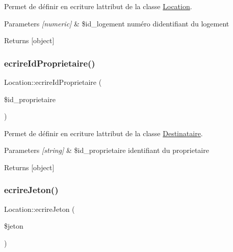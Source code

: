 Permet de définir en ecriture l\textquotesingle{}attribut de la classe \hyperlink{class_location}{Location}. 


\begin{DoxyParams}{Parameters}
{\em \mbox{[}numeric\mbox{]}} & \$id\+\_\+logement numéro d\textquotesingle{}identifiant du logement \\
\hline
\end{DoxyParams}
\begin{DoxyReturn}{Returns}
\mbox{[}object\mbox{]} 
\end{DoxyReturn}
\mbox{\label{class_location_a7d047747d2fe3745641adee427b1b6e0}} 
\subsubsection{\texorpdfstring{ecrire\+Id\+Proprietaire()}{ecrireIdProprietaire()}}
{\footnotesize\ttfamily Location\+::ecrire\+Id\+Proprietaire (\begin{DoxyParamCaption}\item[{}]{\$id\+\_\+proprietaire }\end{DoxyParamCaption})}



Permet de définir en ecriture l\textquotesingle{}attribut de la classe \hyperlink{class_destinataire}{Destinataire}. 


\begin{DoxyParams}{Parameters}
{\em \mbox{[}string\mbox{]}} & \$id\+\_\+proprietaire identifiant du proprietaire \\
\hline
\end{DoxyParams}
\begin{DoxyReturn}{Returns}
\mbox{[}object\mbox{]} 
\end{DoxyReturn}
\mbox{\label{class_location_a7a9107c7f4f6bf5dac4a6d1e614462ad}} 
\subsubsection{\texorpdfstring{ecrire\+Jeton()}{ecrireJeton()}}
{\footnotesize\ttfamily Location\+::ecrire\+Jeton (\begin{DoxyParamCaption}\item[{}]{\$jeton }\end{DoxyParamCaption})}



